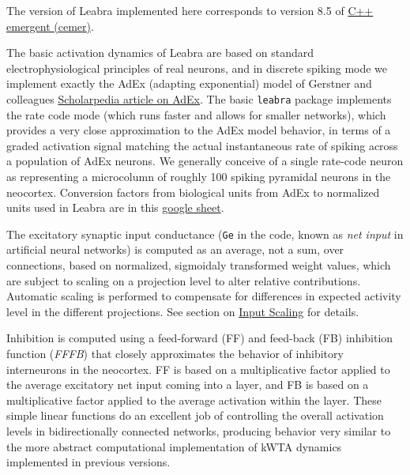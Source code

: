 The version of Leabra implemented here corresponds to version 8.5 of
\href{https://github.com/emer/cemer}{C++ emergent (cemer)}.

The basic activation dynamics of Leabra are based on standard
electrophysiological principles of real neurons, and in discrete spiking
mode we implement exactly the AdEx (adapting exponential) model of
Gerstner and colleagues
\href{https://www.scholarpedia.org/article/Adaptive_exponential_integrate-and-fire_model}{Scholarpedia
article on AdEx}. The basic \texttt{leabra} package implements the rate
code mode (which runs faster and allows for smaller networks), which
provides a very close approximation to the AdEx model behavior, in terms
of a graded activation signal matching the actual instantaneous rate of
spiking across a population of AdEx neurons. We generally conceive of a
single rate-code neuron as representing a microcolumn of roughly 100
spiking pyramidal neurons in the neocortex. Conversion factors from
biological units from AdEx to normalized units used in Leabra are in
this
\href{https://docs.google.com/spreadsheets/d/1jn-NcXY4-y3pOw6inFOgPYlaQodrGIjcsAWkiD9f1FQ/edit?usp=sharing}{google
sheet}.

The excitatory synaptic input conductance (\texttt{Ge} in the code,
known as \emph{net input} in artificial neural networks) is computed as
an average, not a sum, over connections, based on normalized, sigmoidaly
transformed weight values, which are subject to scaling on a projection
level to alter relative contributions. Automatic scaling is performed to
compensate for differences in expected activity level in the different
projections. See section on \protect\hyperlink{input-scaling}{Input
Scaling} for details.

Inhibition is computed using a feed-forward (FF) and feed-back (FB)
inhibition function (\emph{FFFB}) that closely approximates the behavior
of inhibitory interneurons in the neocortex. FF is based on a
multiplicative factor applied to the average excitatory net input coming
into a layer, and FB is based on a multiplicative factor applied to the
average activation within the layer. These simple linear functions do an
excellent job of controlling the overall activation levels in
bidirectionally connected networks, producing behavior very similar to
the more abstract computational implementation of kWTA dynamics
implemented in previous versions.

